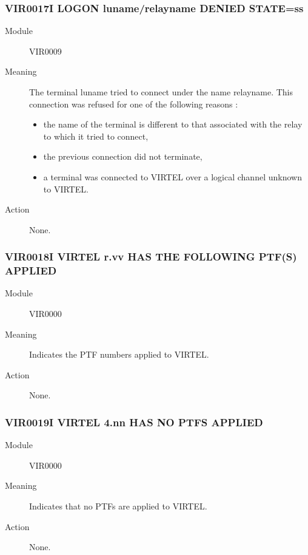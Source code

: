 \documentclass[letterpaper,10pt,english]{sphinxmanual}
\begin{document}
\subsubsection{VIR0017I LOGON luname/relayname DENIED STATE=ss}
\label{\detokenize{messages:vir0017i-logon-luname-relayname-denied-state-ss}}\begin{description}
\item[{Module}] \leavevmode
VIR0009

\item[{Meaning}] \leavevmode
The terminal luname tried to connect under the name relayname. This connection was refused for one of the following reasons :
\begin{itemize}
\item {} 
the name of the terminal is different to that associated with the relay to which it tried to connect,

\item {} 
the previous connection did not terminate,

\item {} 
a terminal was connected to VIRTEL over a logical channel unknown to VIRTEL.

\end{itemize}

\item[{Action}] \leavevmode
None.

\end{description}


\subsubsection{VIR0018I VIRTEL r.vv HAS THE FOLLOWING PTF(S) APPLIED}
\label{\detokenize{messages:vir0018i-virtel-r-vv-has-the-following-ptf-s-applied}}\begin{description}
\item[{Module}] \leavevmode
VIR0000

\item[{Meaning}] \leavevmode
Indicates the PTF numbers applied to VIRTEL.

\item[{Action}] \leavevmode
None.

\end{description}


\subsubsection{VIR0019I VIRTEL 4.nn HAS NO PTFS APPLIED}
\label{\detokenize{messages:vir0019i-virtel-4-nn-has-no-ptfs-applied}}\begin{description}
\item[{Module}] \leavevmode
VIR0000

\item[{Meaning}] \leavevmode
Indicates that no PTFs are applied to VIRTEL.

\item[{Action}] \leavevmode
None.

\end{description}
\end{document}
